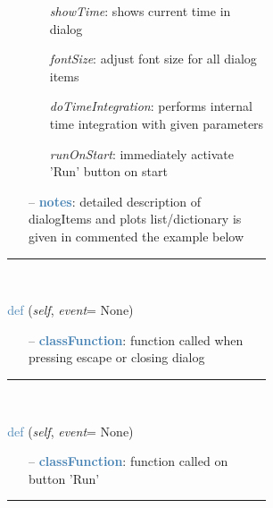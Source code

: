 \begin{itemize}[leftmargin=1.4cm]
\begin{itemize}[leftmargin=0.5cm]
\begin{itemize}[leftmargin=1.4cm]
\begin{itemize}[leftmargin=1.4cm]
\begin{itemize}[leftmargin=0.5cm]
\begin{itemize}[leftmargin=1.4cm]
\begin{itemize}[leftmargin=0.5cm]
\begin{itemize}[leftmargin=1.4cm]
\begin{itemize}[leftmargin=1.4cm]
\begin{itemize}[leftmargin=0.7cm]
\begin{itemize}[leftmargin=1.2cm]
    \item[] {\it   showTime}: shows current time in dialog
    \item[] {\it   fontSize}: adjust font size for all dialog items
    \item[] {\it   doTimeIntegration}: performs internal time integration with given parameters
    \item[] {\it   runOnStart}: immediately activate 'Run' button on start
  \end{itemize}
  \item[--]  \textcolor{steelblue}{\bf notes}: detailed description of dialogItems and plots list/dictionary is given in commented the example below\vspace{12pt}\end{itemize}
%
\noindent\rule{8cm}{0.75pt}\vspace{1pt} \\ 
\begin{flushleft}
\noindent \textcolor{steelblue}{def {\bf {}}}\label{sec:interactive:InteractiveDialog:OnQuit}
({\it self}, {\it event}= None)
\end{flushleft}
\setlength{\itemindent}{0.7cm}
\begin{itemize}[leftmargin=0.7cm]
  \item[--]  \textcolor{steelblue}{\bf classFunction}: function called when pressing escape or closing dialog\vspace{12pt}\end{itemize}
%
\noindent\rule{8cm}{0.75pt}\vspace{1pt} \\ 
\begin{flushleft}
\noindent \textcolor{steelblue}{def {\bf {}}}\label{sec:interactive:InteractiveDialog:StartSimulation}
({\it self}, {\it event}= None)
\end{flushleft}
\setlength{\itemindent}{0.7cm}
\begin{itemize}[leftmargin=0.7cm]
  \item[--]  \textcolor{steelblue}{\bf classFunction}: function called on button 'Run'\vspace{12pt}\end{itemize}
%
\noindent\rule{8cm}{0.75pt}\vspace{1pt} \\ 

\end{itemize}
\end{itemize}
\end{itemize}
\end{itemize}
\end{itemize}
\end{itemize}
\end{itemize}
\end{itemize}
\end{itemize}
